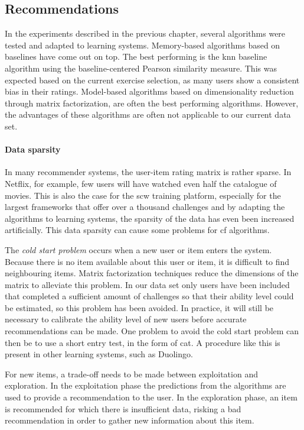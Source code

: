 \subsection{Recommendations}
In the experiments described in the previous chapter, several algorithms were tested and adapted to learning systems.
Memory-based algorithms based on baselines have come out on top.
The best performing is the \gls{knn} baseline algorithm using the baseline-centered Pearson similarity measure.
This was expected based on the current exercise selection, as many users show a consistent bias in their ratings.
Model-based algorithms based on dimensionality reduction through matrix factorization, are often the best performing algorithms.
However, the advantages of these algorithms are often not applicable to our current data set.

\paragraph{Data sparsity}
In many recommender systems, the user-item rating matrix is rather sparse.
In Netflix, for example, few users will have watched even half the catalogue of movies.
This is also the case for the \gls{scw} training platform, especially for the largest frameworks that offer over a thousand challenges and by adapting the algorithms to learning systems, the sparsity of the data has even been increased artificially.
This data sparsity can cause some problems for \gls{cf} algorithms.

The \emph{cold start problem} occurs when a new user or item enters the system.
Because there is no item available about this user or item, it is difficult to find neighbouring items.
Matrix factorization techniques reduce the dimensions of the matrix to alleviate this problem.
In our data set only users have been included that completed a sufficient amount of challenges so that their ability level could be estimated, so this problem has been avoided.
In practice, it will still be necessary to calibrate the ability level of new users before accurate recommendations can be made.
One problem to avoid the cold start problem can then be to use a short entry test, in the form of \gls{cat}.
A procedure like this is present in other learning systems, such as Duolingo.

For new items, a trade-off needs to be made between exploitation and exploration.
In the exploitation phase the predictions from the algorithms are used to provide a recommendation to the user.
In the exploration phase, an item is recommended for which there is insufficient data, risking a bad recommendation in order to gather new information about this item.

